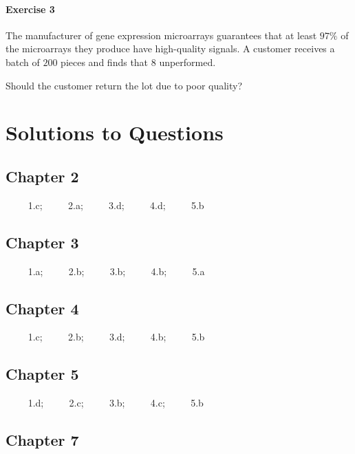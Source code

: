 \documentclass[
]{book}
\begin{document}
\hypertarget{exercise-3-9}{%
\subsubsection{Exercise 3}\label{exercise-3-9}}

The manufacturer of gene expression microarrays guarantees that at least \(97\%\) of the microarrays they produce have high-quality signals. A customer receives a batch of \(200\) pieces and finds that \(8\) unperformed.

Should the customer return the lot due to poor quality?

\hypertarget{solutions-to-questions}{%
\chapter{Solutions to Questions}\label{solutions-to-questions}}

\hypertarget{chapter-2}{%
\section{Chapter 2}\label{chapter-2}}

\(\qquad\) 1.c; \(\qquad\) 2.a; \(\qquad\) 3.d; \(\qquad\) 4.d; \(\qquad\) 5.b

\hypertarget{chapter-3}{%
\section{Chapter 3}\label{chapter-3}}

\(\qquad\) 1.a; \(\qquad\) 2.b; \(\qquad\) 3.b; \(\qquad\) 4.b; \(\qquad\) 5.a

\hypertarget{chapter-4}{%
\section{Chapter 4}\label{chapter-4}}

\(\qquad\) 1.c; \(\qquad\) 2.b; \(\qquad\) 3.d; \(\qquad\) 4.b; \(\qquad\) 5.b

\hypertarget{chapter-5}{%
\section{Chapter 5}\label{chapter-5}}

\(\qquad\) 1.d; \(\qquad\) 2.c; \(\qquad\) 3.b; \(\qquad\) 4.c; \(\qquad\) 5.b

\hypertarget{chapter-7}{%
\section{Chapter 7}\label{chapter-7}}
\end{document}
